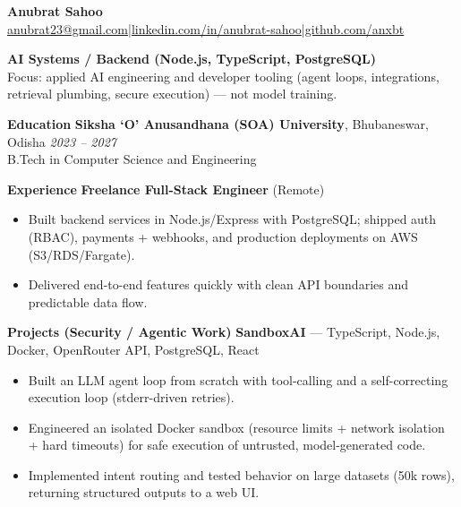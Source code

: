 \documentclass[10pt,a4paper]{article}
\begin{document}
\begin{center}
{\LARGE\bfseries Anubrat Sahoo}\\
\small \href{mailto:anubrat23@gmail.com}{anubrat23@gmail.com}\;|\;\href{https://linkedin.com/in/anubrat-sahoo}{linkedin.com/in/anubrat-sahoo}\;|\;\href{https://github.com/anxbt}{github.com/anxbt}
\end{center}

{\large\bfseries AI Systems / Backend (Node.js, TypeScript, PostgreSQL)}\\
\small Focus: applied AI engineering and developer tooling (agent loops, integrations, retrieval plumbing, secure execution) — not model training.

\vspace{6pt}
{\large\bfseries Education}
\vspace{2pt}
\textbf{Siksha ‘O’ Anusandhana (SOA) University}, Bhubaneswar, Odisha \hfill \textit{2023 -- 2027}\\
B.Tech in Computer Science and Engineering

\vspace{6pt}
{\large\bfseries Experience}
\vspace{2pt}
\textbf{Freelance Full-Stack Engineer} (Remote)\\
\begin{itemize}
  \item Built backend services in Node.js/Express with PostgreSQL; shipped auth (RBAC), payments + webhooks, and production deployments on AWS (S3/RDS/Fargate).
  \item Delivered end-to-end features quickly with clean API boundaries and predictable data flow.
\end{itemize}

\vspace{6pt}
{\large\bfseries Projects (Security / Agentic Work)}
\vspace{2pt}
\textbf{SandboxAI} — TypeScript, Node.js, Docker, OpenRouter API, PostgreSQL, React\\
\begin{itemize}
  \item Built an LLM agent loop from scratch with tool-calling and a self-correcting execution loop (stderr-driven retries).
  \item Engineered an isolated Docker sandbox (resource limits + network isolation + hard timeouts) for safe execution of untrusted, model-generated code.
  \item Implemented intent routing and tested behavior on large datasets (50k rows), returning structured outputs to a web UI.
\end{itemize}
\end{document}
